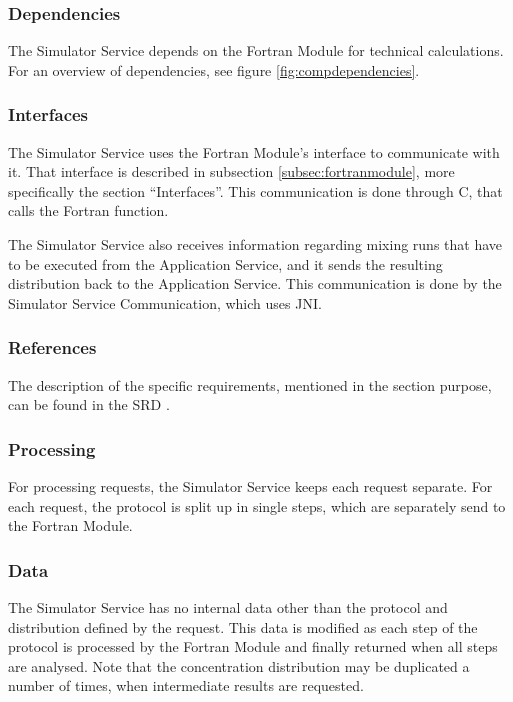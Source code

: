 \subsubsection*{Dependencies}
The Simulator Service depends on the Fortran Module for technical calculations. For an overview of dependencies, see figure \ref{fig:compdependencies}.

\subsubsection*{Interfaces}
The Simulator Service uses the Fortran Module's interface to communicate with it. That interface is described in subsection \ref{subsec:fortranmodule}, more specifically the section ``Interfaces''. This communication is done through C, that calls the Fortran function.

The Simulator Service also receives information regarding mixing runs that have to be executed from the Application Service, and it sends the resulting distribution back to the Application Service. This communication is done by the Simulator Service Communication, which uses JNI.

\subsubsection*{References}
The description of the specific requirements, mentioned in the section purpose, can be found in the SRD \cite{srd}.

\subsubsection*{Processing}
For processing requests, the Simulator Service keeps each request separate. For each request, the protocol is split up in single steps, which are separately send to the Fortran Module.

\subsubsection*{Data}
The Simulator Service has no internal data other than the protocol and distribution defined by the request. This data is modified as each step of the protocol is processed by the Fortran Module and finally returned when all steps are analysed. Note that the concentration distribution may be duplicated a number of times, when intermediate results are requested.

